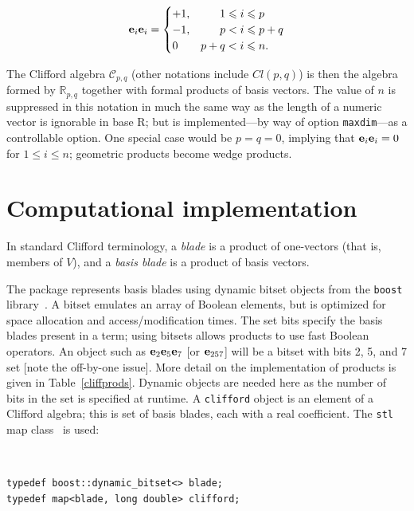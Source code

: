 \documentclass{birkjour}
\theoremstyle{definition}
\theoremstyle{remark}
\numberwithin{equation}{section}
\begin{document}
\begin{equation}\label{posdefcliff2}
\ei{i}\ei{i} = \begin{cases}
    +1, & \hphantom{p+{}}1\leqslant i\leqslant p\\
    -1, & \hphantom{p+{}}p < i\leqslant p+q\\
    0   & p+q < i\leqslant n.
  \end{cases}
\end{equation}

The Clifford algebra ${\mathcal C}_{p,q}$ (other notations include
$Cl(p,q)$) is then the algebra formed by $\mathbb{R}_{p,q}$ together
with formal products of basis vectors.  The value of
  $n$ is suppressed in this notation in much the same way as the
  length of a numeric vector is ignorable in base R; but is
  implemented---by way of option {\tt maxdim}---as a controllable
  option.  One special case would be $p=q=0$, implying that
${\bf e}_{i}{\bf e}_{i}=0$ for $1\leqslant i\leqslant n$; geometric products
become wedge products.

\section{Computational implementation}

In standard Clifford terminology, a {\em blade} is a
  product of one-vectors (that is, members of $V$), and a {\em basis
    blade} is a product of basis vectors.

The package represents basis blades using dynamic bitset objects from
the {\tt boost} library~\cite{karlsson2005}.  A bitset emulates an
array of Boolean elements, but is optimized for space allocation and
access/modification times.  The set bits specify the basis blades
present in a term; using bitsets allows products to use fast Boolean
operators.  An object such as ${\bf e}_{2}{\bf e}_{5}{\bf e}_{7}$ [or ${\bf e}_{257}$]
will be a bitset with bits 2, 5, and 7 set [note the off-by-one
  issue].  More detail on the implementation of products is given in
Table~\ref{cliffprods}.  Dynamic objects are needed here as the number
of bits in the set is specified at runtime.  A {\tt clifford} object
is an element of a Clifford algebra; this is set of basis blades, each
with a real coefficient.  The {\tt stl} map class~\cite{musser2009} is
used:

{\ }\\[10pt]
\begin{verbatim}
typedef boost::dynamic_bitset<> blade;
typedef map<blade, long double> clifford;
\end{verbatim}
\end{document}

